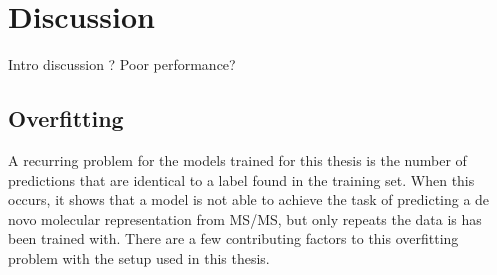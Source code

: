\chapter{Discussion}
\label{chap:discussion}

Intro discussion ? Poor performance?

\section{Overfitting}
\label{sec:overfitting}

A recurring problem for the models trained for this thesis is the number of predictions that are identical to a label found in the training set.
When this occurs, it shows that a model is not able to achieve the task of predicting a de novo molecular representation from \ac{MS/MS}, but only repeats the data is has been trained with.
There are a few contributing factors to this overfitting problem with the setup used in this thesis.

